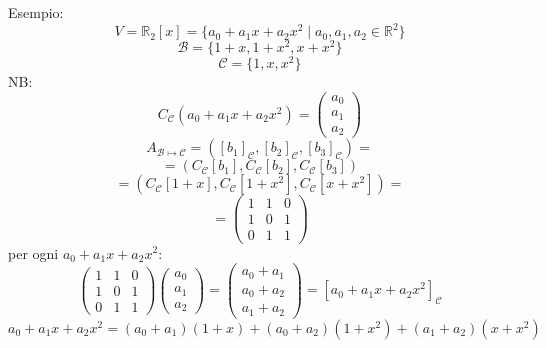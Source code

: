 \documentclass[12pt]{article}
\begin{document}
Esempio:
\[V = \mathbb{R}_2[x] = \{a_0 + a_1x + a_2x^2 \mid a_0, a_1, a_2 \in \mathbb{R}^2\}\]
\[\mathcal{B} = \{1+x, 1+x^2, x+x^2\}\]
\[\mathcal{C} = \{1, x, x^2\}\]
NB:
\[C_{\mathcal{C}}(a_0 + a_1x + a_2x^2) = \begin{pmatrix}
    a_0\\
    a_1\\
    a_2
\end{pmatrix}\]
\[A_{\mathcal{B} \mapsto \mathcal{C}} = ([b_1]_{\mathcal{C}}, [b_2]_{\mathcal{C}}, [b_3]_{\mathcal{C}}) = \]
\[= (C_{\mathcal{C}}[b_1], C_{\mathcal{C}}[b_2], C_{\mathcal{C}}[b_3])\]
\[= (C_{\mathcal{C}}[1+x], C_{\mathcal{C}}[1+x^2], C_{\mathcal{C}}[x+x^2]) =\]
\[= \begin{pmatrix}
    1 & 1 & 0\\
    1 & 0 & 1\\
    0 & 1 & 1
\end{pmatrix}\]
per ogni $a_0 + a_1x + a_2x^2: $
\[\begin{pmatrix}
    1 & 1 & 0\\
    1 & 0 & 1\\
    0 & 1 & 1
\end{pmatrix}\begin{pmatrix}
    a_0\\
    a_1\\
    a_2
\end{pmatrix} = \begin{pmatrix}
    a_0 + a_1\\
    a_0 + a_2\\
    a_1 + a_2
\end{pmatrix} = [a_0 + a_1x + a_2x^2]_{\mathcal{C}}\]
\[a_0 + a_1x + a_2x^2 = (a_0 + a_1)(1+x) + (a_0+a_2)(1+x^2) + (a_1 + a_2)(x+x^2)\]
\end{document}
